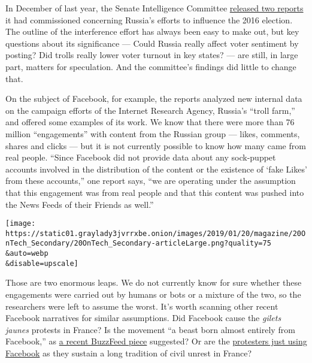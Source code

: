 In December of last year, the Senate Intelligence Committee
\href{https://www.intelligence.senate.gov/press/new-reports-shed-light-internet-research-agency\%E2\%80\%99s-social-media-tactics}{released
two reports} it had commissioned concerning Russia's efforts to
influence the 2016 election. The outline of the interference effort has
always been easy to make out, but key questions about its significance
--- Could Russia really affect voter sentiment by posting? Did trolls
really lower voter turnout in key states? --- are still, in large part,
matters for speculation. And the committee's findings did little to
change that.

On the subject of Facebook, for example, the reports analyzed new
internal data on the campaign efforts of the Internet Research Agency,
Russia's ``troll farm,'' and offered some examples of its work. We know
that there were more than 76 million ``engagements'' with content from
the Russian group --- likes, comments, shares and clicks --- but it is
not currently possible to know how many came from real people. ``Since
Facebook did not provide data about any sock-puppet accounts involved in
the distribution of the content or the existence of `fake Likes' from
these accounts,'' one report says, ``we are operating under the
assumption that this engagement was from real people and that this
content was pushed into the News Feeds of their Friends as well.''

\texttt{[image: https://static01.graylady3jvrrxbe.onion/images/2019/01/20/magazine/20OnTech\_Secondary/20OnTech\_Secondary-articleLarge.png?quality=75\\\&auto=webp\\\&disable=upscale]}

Those are two enormous leaps. We do not currently know for sure whether
these engagements were carried out by humans or bots or a mixture of the
two, so the researchers were left to assume the worst. It's worth
scanning other recent Facebook narratives for similar assumptions. Did
Facebook cause the \emph{gilets jaunes} protests in France? Is the
movement ``a beast born almost entirely from Facebook,'' as
\href{https://www.buzzfeednews.com/article/ryanhatesthis/france-paris-yellow-jackets-facebook}{a
recent BuzzFeed piece} suggested? Or are the
\href{https://popula.com/2018/12/19/five-notes-on-the-yellow-vest-movement/}{protesters
just using Facebook} as they sustain a long tradition of civil unrest in
France?

